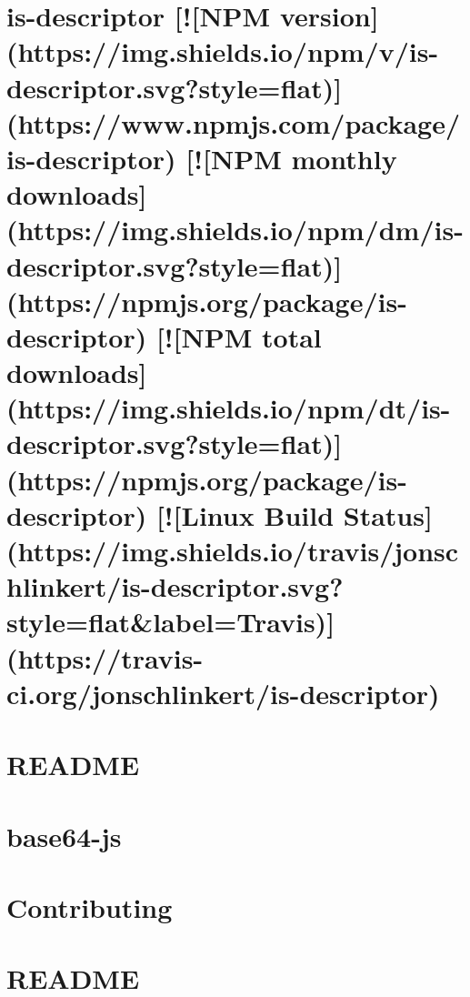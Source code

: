 \documentclass[twoside]{book}
\newcommand{\+}{\discretionary{\mbox{\scriptsize$\hookleftarrow$}}{}{}}
\begin{document}
\chapter{is-\/descriptor \mbox{[}!\mbox{[}N\+PM version\mbox{]}(https\+://img.shields.\+io/npm/v/is-\/descriptor.svg?style=flat)\mbox{]}(https\+://www.npmjs.\+com/package/is-\/descriptor) \mbox{[}!\mbox{[}N\+PM monthly downloads\mbox{]}(https\+://img.shields.\+io/npm/dm/is-\/descriptor.svg?style=flat)\mbox{]}(https\+://npmjs.org/package/is-\/descriptor) \mbox{[}!\mbox{[}N\+PM total downloads\mbox{]}(https\+://img.shields.\+io/npm/dt/is-\/descriptor.svg?style=flat)\mbox{]}(https\+://npmjs.org/package/is-\/descriptor) \mbox{[}!\mbox{[}Linux Build Status\mbox{]}(https\+://img.shields.\+io/travis/jonschlinkert/is-\/descriptor.svg?style=flat\&label=Travis)\mbox{]}(https\+://travis-\/ci.org/jonschlinkert/is-\/descriptor)}
\label{md_dsmacc_vis_degree_node_modules_base_node_modules_is-descriptor_README}

\chapter{R\+E\+A\+D\+ME}
\label{md_dsmacc_vis_degree_node_modules_base_README}

\chapter{base64-\/js}
\label{md_dsmacc_vis_degree_node_modules_base64-js_README}

\chapter{Contributing}
\label{md_dsmacc_vis_degree_node_modules_bcrypt-pbkdf_CONTRIBUTING}

\chapter{R\+E\+A\+D\+ME}
\label{md_dsmacc_vis_degree_node_modules_bcrypt-pbkdf_README}

\end{document}

